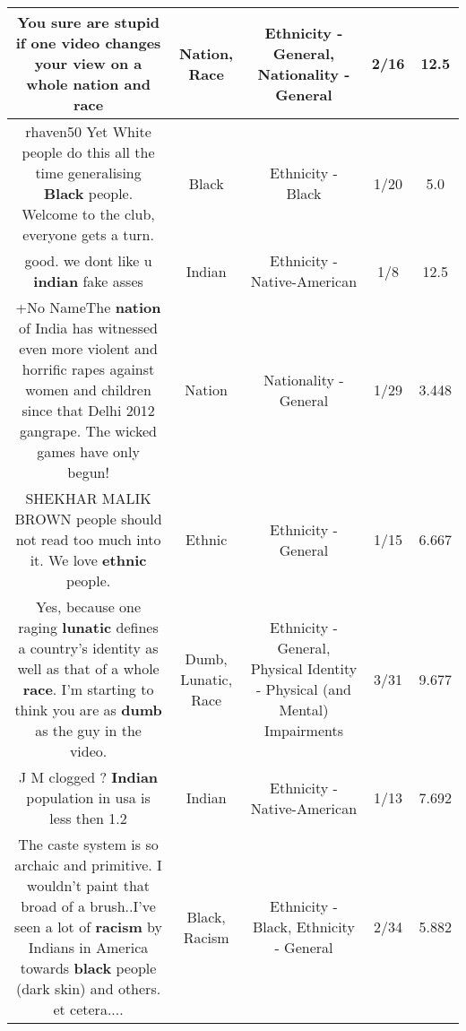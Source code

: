 \documentclass[11pt]{article}
\newlength\mylength
\begin{document}
\begin{center}
\begin{longtable}{|C{.65\mylength}|C{.30\mylength}|C{.12\mylength}|C{.12\mylength}|C{.12\mylength}|}
  \small You sure are stupid if one video changes your view on a whole \textbf{nation} and race\normalsize   & Nation, Race & Ethnicity - General, Nationality - General & 2/16 & 12.5 \\  \hline
  \small rhaven50 Yet White people do this all the time generalising \textbf{Black} people. Welcome to the club, everyone gets a turn.\normalsize   & Black & Ethnicity - Black & 1/20 & 5.0 \\  \hline
  \small good. we dont like u \textbf{indian} fake asses\normalsize   & Indian & Ethnicity - Native-American & 1/8 & 12.5 \\  \hline
  \small +No NameThe \textbf{nation} of India has witnessed even more violent and horrific rapes against women and children since that Delhi 2012 gangrape.  The wicked games have only begun!\normalsize   & Nation & Nationality - General & 1/29 & 3.448 \\  \hline
  \small SHEKHAR MALIK BROWN people should not read too much into it. We love \textbf{ethnic} people.\normalsize   & Ethnic & Ethnicity - General & 1/15 & 6.667 \\  \hline
  \small Yes, because one raging \textbf{lunatic} defines a country's identity as well as that of a whole \textbf{race}. I'm starting to think you are as \textbf{dumb} as the guy in the video.\normalsize   & Dumb, Lunatic, Race & Ethnicity - General, Physical Identity - Physical (and Mental) Impairments & 3/31 & 9.677 \\  \hline
  \small J M clogged ? \textbf{Indian} population in usa is less then 1.2 \normalsize   & Indian & Ethnicity - Native-American & 1/13 & 7.692 \\  \hline
  \small The caste system is so archaic and primitive. I wouldn't paint that broad of a brush..I've seen a lot of \textbf{racism} by Indians in America towards \textbf{black} people (dark skin) and others. et cetera....\normalsize   & Black, Racism & Ethnicity - Black, Ethnicity - General & 2/34 & 5.882 \\  \hline

\end{longtable}
\end{center}
\end{document}
